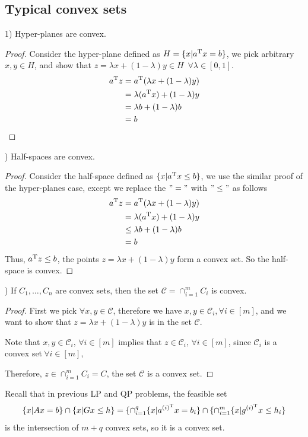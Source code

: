 \subsection{Typical convex sets}

1) Hyper-planes are convex. 
\begin{proof}
Consider the hyper-plane defined as $H = \{x| a^{{\rm T}}x = b \}$, we pick arbitrary $x,y \in H$, and show that $z =\lambda x + (1-\lambda)y \in H$\ $\forall \lambda \in [0,1]$.
\begin{align*}
a^{{\rm T}}z &= a^{{\rm T}}(\lambda x + (1-\lambda)y)\\
&= \lambda(a^{{\rm T}}x) + (1-\lambda)y\\
&= \lambda b + (1-\lambda)b\\
&= b
\end{align*}	
\end{proof}
	
) Half-spaces are convex.
\begin{proof}
Consider the half-space defined as $\{x| a^{{\rm T}}x \leq b \}$, we use the similar proof of the hyper-planes case, except we replace the $"="$ with $"\leq"$ as follows
\begin{align*}
a^{{\rm T}}z &= a^{{\rm T}}(\lambda x + (1-\lambda)y)\\
&= \lambda(a^{{\rm T}}x) + (1-\lambda)y\\
&\leq \lambda b + (1-\lambda)b\\
&= b
\end{align*}
Thus, $a^{{\rm T}}z \leq b$, the points $z = \lambda x + (1-\lambda)y$ form a convex set. So the half-space is convex.
\end{proof}

) If $C_1, \ldots, C_n$ are convex sets, then the set $\mathcal{C} = \cap^m_{i=1} C_i$ is convex.
\begin{proof}
First we pick $\forall x,y\in \mathcal{C}$, therefore we have $x,y\in \mathcal{C}_i,\forall i\in [m]$, and we want to show that $z = \lambda x + (1 - \lambda)y$ is in the set $\mathcal{C}$.
		
Note that $x,y \in \mathcal{C}_i,\, \forall i\in[m]$ implies that $z\in \mathcal{C}_i,\, \forall i\in [m]$, since $\mathcal{C}_i$ is a convex set$\ \forall i\in [m]$,
		
Therefore,  $z\in \cap^m_{i=1}C_i = C$, the set $\mathcal{C}$ is a convex set.		
\end{proof}

\begin{example}

Recall that in previous LP and QP problems, the feasible set 
$$\{x|Ax = b \}\cap \{x|Gx\leq h \} = \{\cap^q_{i=1}\{x|a^{(i)^{{\rm T}}}x = b_i  \}\cap \{\cap^m_{i=1}\{x|g^{(i)^{{\rm T}}}x \leq h_i \}$$
is the intersection of $m+q$ convex sets, so it is a convex set.
\end{example}

